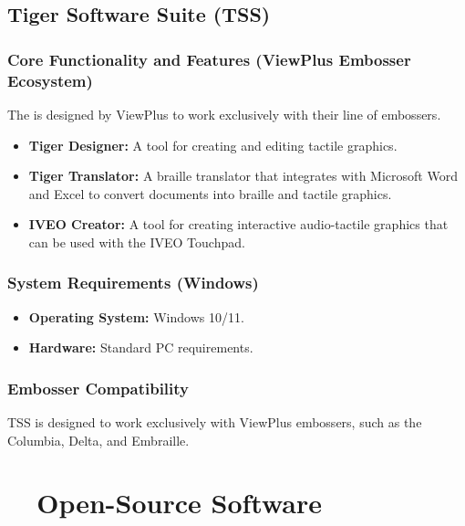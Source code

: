 \subsection{Tiger Software Suite (TSS)}\label{ch14:ssec:tss}
\subsubsection{Core Functionality and Features (ViewPlus Embosser Ecosystem)}\label{ch14:sssec:tss-features}
The  is designed by ViewPlus\supercite{ViewplusTSS, ViewPlusTigerSuite} to work exclusively with their line of embossers.
\begin{itemize}
	\item \textbf{Tiger Designer:} A tool for creating and editing tactile graphics.
	\item \textbf{Tiger Translator:} A braille translator that integrates with Microsoft Word and Excel to convert documents into braille and tactile graphics.
	\item \textbf{IVEO Creator:} A tool for creating interactive audio-tactile graphics that can be used with the IVEO Touchpad\supercite{ViewPlusAGC}.
\end{itemize}

\subsubsection{System Requirements (Windows)}\label{ch14:sssec:tss-sysreq}
\begin{itemize}
	\item \textbf{Operating System:} Windows 10/11.
	\item \textbf{Hardware:} Standard PC requirements.
\end{itemize}

\subsubsection{Embosser Compatibility}\label{ch14:sssec:tss-compat}
TSS is designed to work exclusively with ViewPlus embossers, such as the Columbia, Delta, and Embraille\supercite{ViewPlusProduct}.

\section{~~Open-Source  Software}\label{ch14:sec:open-source-software}
